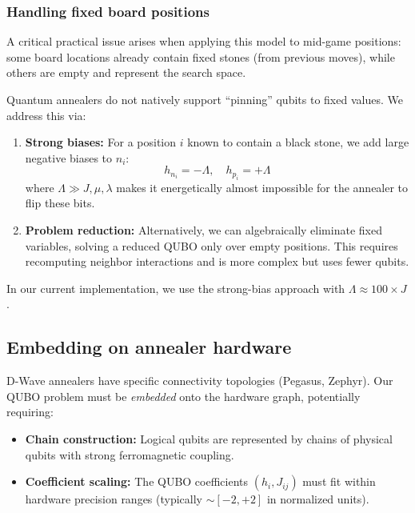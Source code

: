 \documentclass[aps,prl,reprint]{revtex4-2}
\begin{document}
\subsubsection{Handling fixed board positions}

A critical practical issue arises when applying this model to mid-game positions: some board locations already contain fixed stones (from previous moves), while others are empty and represent the search space.

Quantum annealers do not natively support ``pinning'' qubits to fixed values. We address this via:

\begin{enumerate}
	\item \textbf{Strong biases:} For a position $i$ known to contain a black stone, we add large negative biases to $n_i$:
	\begin{equation}
	h_{n_i} = -\Lambda, \quad h_{p_i} = +\Lambda
	\end{equation}
	where $\Lambda \gg J, \mu, \lambda$ makes it energetically almost impossible for the annealer to flip these bits.
	
	\item \textbf{Problem reduction:} Alternatively, we can algebraically eliminate fixed variables, solving a reduced QUBO only over empty positions. This requires recomputing neighbor interactions and is more complex but uses fewer qubits.
\end{enumerate}

In our current implementation, we use the strong-bias approach with $\Lambda \approx 100 \times J$.

\subsection{Embedding on annealer hardware}

D-Wave annealers have specific connectivity topologies (Pegasus, Zephyr). Our QUBO problem must be \textit{embedded} onto the hardware graph, potentially requiring:

\begin{itemize}
	\item \textbf{Chain construction:} Logical qubits are represented by chains of physical qubits with strong ferromagnetic coupling.
	\item \textbf{Coefficient scaling:} The QUBO coefficients $(h_i, J_{ij})$ must fit within hardware precision ranges (typically $\sim [-2, +2]$ in normalized units).
\end{itemize}
\end{document}
